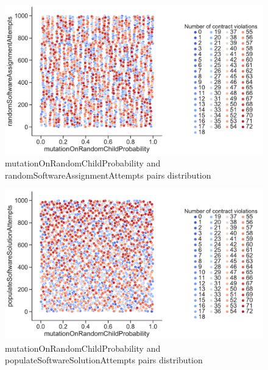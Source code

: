\begin{figure}
	\centering
	\includegraphics[width=\textwidth]{images/PairsDistr/mutationOnRandomChildProbability_randomSoftwareAssignmentAttempts.pdf}
	\caption[mutationOnRandomChildProbability and randomSoftwareAssignmentAttempts pairs distribution]{mutationOnRandomChildProbability and randomSoftwareAssignmentAttempts pairs distribution} 
	\label{fig:mutationOnRandomChildProbability_randomSoftwareAssignmentAttempts_pair}
\end{figure}
\begin{figure}
	\centering
	\includegraphics[width=\textwidth]{images/PairsDistr/mutationOnRandomChildProbability_populateSoftwareSolutionAttempts.pdf}
	\caption[mutationOnRandomChildProbability and populateSoftwareSolutionAttempts pairs distribution]{mutationOnRandomChildProbability and populateSoftwareSolutionAttempts pairs distribution} 
	\label{fig:mutationOnRandomChildProbability_populateSoftwareSolutionAttempts_pair}
\end{figure}
